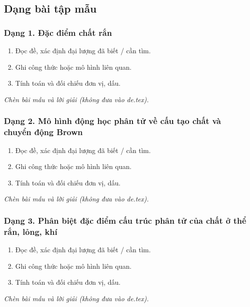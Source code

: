 

\subsection{Dạng bài tập mẫu}
\subsubsection{Dạng 1. Đặc điểm chất rắn}
\begin{phuongphap}
\begin{enumerate}
\item Đọc đề, xác định đại lượng đã biết / cần tìm.
\item Ghi công thức hoặc mô hình liên quan.
\item Tính toán và đối chiếu đơn vị, dấu.
\end{enumerate}
\end{phuongphap}
\begin{vidumau}
\textit{Chèn bài mẫu và lời giải (không đưa vào de.tex).}
\end{vidumau}

\subsubsection{Dạng 2. Mô hình động học phân tử về cấu tạo chất và chuyển động Brown}
\begin{phuongphap}
\begin{enumerate}
\item Đọc đề, xác định đại lượng đã biết / cần tìm.
\item Ghi công thức hoặc mô hình liên quan.
\item Tính toán và đối chiếu đơn vị, dấu.
\end{enumerate}
\end{phuongphap}
\begin{vidumau}
\textit{Chèn bài mẫu và lời giải (không đưa vào de.tex).}
\end{vidumau}

\subsubsection{Dạng 3. Phân biệt đặc điểm cấu trúc phân tử của chất ở thể rắn, lỏng, khí}
\begin{phuongphap}
\begin{enumerate}
\item Đọc đề, xác định đại lượng đã biết / cần tìm.
\item Ghi công thức hoặc mô hình liên quan.
\item Tính toán và đối chiếu đơn vị, dấu.
\end{enumerate}
\end{phuongphap}
\begin{vidumau}
\textit{Chèn bài mẫu và lời giải (không đưa vào de.tex).}
\end{vidumau}

